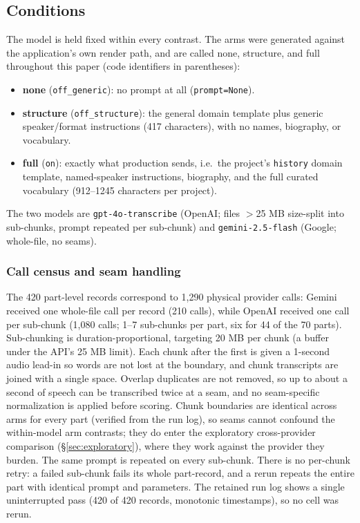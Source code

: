 \documentclass[11pt]{article}
\begin{document}
\subsection{Conditions}
\label{sec:conditions}

The model is held fixed within every contrast. The arms were generated against the application's own render path, and are called none, structure, and full throughout this paper (code identifiers in parentheses):

\begin{itemize}
\item \textbf{none} (\texttt{off\_generic}): no prompt at all (\texttt{prompt=None}).
\item \textbf{structure} (\texttt{off\_structure}): the general domain template plus generic speaker/format instructions (417 characters), with no names, biography, or vocabulary.
\item \textbf{full} (\texttt{on}): exactly what production sends, i.e.\ the project's \texttt{history} domain template, named-speaker instructions, biography, and the full curated vocabulary (912--1245 characters per project).
\end{itemize}

The two models are \texttt{gpt-4o-transcribe} (OpenAI; files $>$25 MB size-split into sub-chunks, prompt repeated per sub-chunk) and \texttt{gemini-2.5-flash} (Google; whole-file, no seams).

\subsubsection*{Call census and seam handling}

The 420 part-level records correspond to 1{,}290 physical provider calls: Gemini received one whole-file call per record (210 calls), while OpenAI received one call per sub-chunk (1{,}080 calls; 1--7 sub-chunks per part, six for 44 of the 70 parts). Sub-chunking is duration-proportional, targeting 20 MB per chunk (a buffer under the API's 25 MB limit). Each chunk after the first is given a 1-second audio lead-in so words are not lost at the boundary, and chunk transcripts are joined with a single space. Overlap duplicates are not removed, so up to about a second of speech can be transcribed twice at a seam, and no seam-specific normalization is applied before scoring. Chunk boundaries are identical across arms for every part (verified from the run log), so seams cannot confound the within-model arm contrasts; they do enter the exploratory cross-provider comparison (\S\ref{sec:exploratory}), where they work against the provider they burden. The same prompt is repeated on every sub-chunk. There is no per-chunk retry: a failed sub-chunk fails its whole part-record, and a rerun repeats the entire part with identical prompt and parameters. The retained run log shows a single uninterrupted pass (420 of 420 records, monotonic timestamps), so no cell was rerun.
\end{document}
